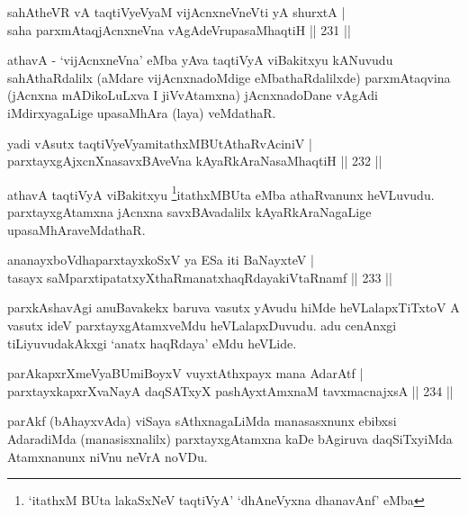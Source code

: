 \begin{shl}
sahAtheVR vA taqtiVyeVyaM vijAcnxneVneVti yA shurxtA |\\
saha parxmAtaqjAcnxneVna vAgAdeVrupasaMhaqtiH \hfill || 231 ||
\end{shl}

\begin{artha}
athavA - `vijAcnxneVna' eMba yAva taqtiVyA viBakitxyu kANuvudu  sahAthaRdalilx (aMdare vijAcnxnadoMdige eMbathaRdalilxde) parxmAtaqvina (jAcnxna mADikoLuLxva I jiVvAtamxna) jAcnxnadoDane vAgAdi iMdirxyagaLige upasaMhAra (laya) veMdathaR.
\end{artha}

\begin{shl}
yadi vA\s sutx taqtiVyeVyamitathxMBUtAthaRvAciniV |\\
parxtayxgAjxcnXnasavxBAveVna kAyaRkAraNasaMhaqtiH \hfill || 232 ||
\end{shl}

\begin{artha}
athavA taqtiVyA viBakitxyu \footnote{`itathxM BUta lakaSxNeV taqtiVyA' `dhAneVyxna dhanavAnf' eMba}itathxMBUta eMba athaRvanunx heVLuvudu. parxtayxgAtamxna jAcnxna savxBAvadalilx kAyaRkAraNagaLige upasaMhAraveMdathaR.
\end{artha}

\begin{shl}
ananayxboVdhaparxtayxkoSxV ya ESa iti BaNayxteV |\\
tasayx saMparxtipatatxyXthaRmanatxhaqRdayakiVtaRnamf \hfill || 233 ||
\end{shl}

\begin{artha}
parxkAshavAgi anuBavakekx baruva vasutx yAvudu hiMde heVLalapxTiTxtoV A vasutx ideV parxtayxgAtamxveMdu heVLalapxDuvudu. adu cenAnxgi tiLiyuvudakAkxgi `anatx haqRdaya' eMdu heVLide.
\end{artha}


\begin{shl}
parAkapxrXmeVyaBUmiBoyxV vuyxtAthxpayx mana AdarAtf |\\
parxtayxkapxrXvaNayA daqSATxyX pashAyx\s \s tAmxnaM tavxmacnajxsA \hfill || 234 ||
\end{shl}

\begin{artha}
parAkf (bAhayxvAda) viSaya sAthxnagaLiMda manasasxnunx ebibxsi AdaradiMda (manasisxnalilx) parxtayxgAtamxna kaDe bAgiruva daqSiTxyiMda Atamxnanunx niVnu neVrA noVDu.
\end{artha}

